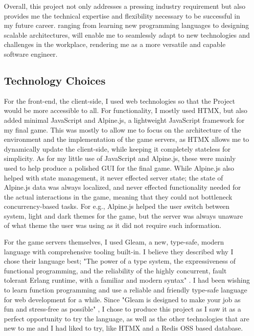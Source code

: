 \documentclass[]{final}
\begin{document}
Overall, this project not only addresses a pressing industry requirement but also provides
me the technical expertise and flexibility necessary to be successful in my future career.
ranging from learning new programming languages to designing scalable architectures, will enable me to
seamlessly adapt to new technologies and challenges in the workplace, rendering me as a more
versatile and capable software engineer.

\newpage


\subsection{Technology Choices}

\label{alpine}

For the front-end, the client-side, I used web technologies so that the Project
would be more accessible to all. For functionality, I mostly used HTMX,
but also added minimal JavaScript and Alpine.js, a lightweight JavaScript
framework \cite{noauthor_alpine.js_nodate} for my final game.
This was mostly to allow me to focus on the
architecture of the environment and the implementation of the game
servers, as HTMX allows me to dynamically update the client-side, while
keeping it completely stateless for simplicity. As for my little use of
JavaScript and Alpine.js, these were mainly used to help produce a polished
GUI for the final game. While Alpine.js also helped with state management,
it never effected server state; the state of Alpine.js data was always
localized, and never effected functionality needed for the actual interactions
in the game, meaning that they could not bottleneck concurrency-based tasks.
For e.g., Alpine.js helped the user switch between system, light and dark
themes for the game, but the server was always unaware of what theme the user
was using as it did not require such information.

\label{REDISOSS}

For the game servers themselves, I used Gleam, a new, type-safe, modern
language with comprehensive tooling built-in. I believe they described why I
chose their language best; "The power of a type system, the expressiveness
of functional programming, and the reliability of the highly concurrent,
fault tolerant Erlang runtime, with a familiar and modern syntax" \cite{noauthor_gleam_nodate}.
I had been wishing to learn function programming and use a reliable and friendly
type-safe language for web development for a while.
Since "Gleam is designed to make your job as fun and stress-free as possible" \cite{noauthor_gleam_nodate},
I chose to produce this project as I saw it as a perfect opportunity to try the
language, as well as the other technologies that are new to me and I had liked
to try, like HTMX and a Redis OSS based database.
\end{document}
